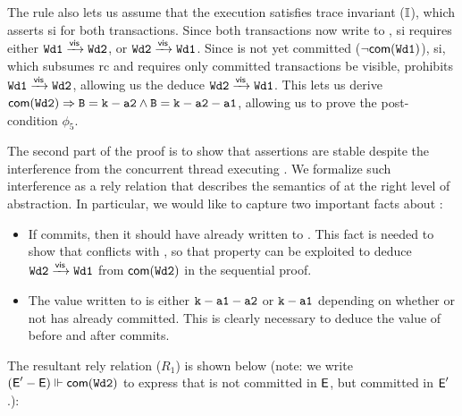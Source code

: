 \noindent The rule also lets us assume that the execution satisfies
trace invariant ($\mathbb{I}$), which asserts {\sc si} for both transactions.
Since both transactions now write to , {\sc si} requires either
${\tt Wd1} \xrightarrow{\textsf{vis}} {\tt Wd2}$, or ${\tt Wd2} \xrightarrow{\textsf{vis}} {\tt Wd1}$. Since 
is not yet committed ($\neg\textsf{com}({\tt Wd1})$), {\sc si}, which
subsumes {\sc rc} and requires only committed transactions be visible,
prohibits ${\tt Wd1} \xrightarrow{\textsf{vis}} {\tt Wd2}$, allowing us the deduce ${\tt Wd2}
\xrightarrow{\textsf{vis}} {\tt Wd1}$. This lets us derive ${\textsf{com}({\tt Wd2})}
\Rightarrow {\tt B = k-a2} \wedge {\tt B = k-a2-a1}$, allowing us to prove
the post-condition $\phi_5$.

The second part of the proof is to show that assertions are stable
despite the interference from the concurrent thread executing
. We formalize such interference as a rely relation that
describes the semantics of  at the right level of
abstraction. In particular, we would like to capture two important
facts about : 
\begin{itemize}
  \item  If  commits, then it should have already written to
  . This fact is needed to show that  conflicts with
  , so that  property can be exploited to deduce
  ${\tt Wd2} \xrightarrow{\textsf{vis}} {\tt Wd1}$ from $\textsf{com}({\tt Wd2})$ in the
  sequential proof.

  \item The value written to  is either ${\tt k-a1-a2}$ or
  ${\tt k-a1}$ depending on whether or not  has already
  committed. This is clearly necessary to deduce the value of 
  before and after  commits.
\end{itemize}
The resultant rely relation ($R_1$) is shown below (note: we
write $(\textsf{E}'-\textsf{E}) \Vdash {\textsf{com}({\tt Wd2})}$ to express that 
is not committed in $\textsf{E}$, but committed in $\textsf{E}'$.):

